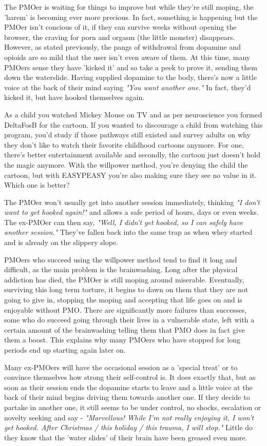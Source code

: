 \documentclass[easypeasy.tex]{subfiles}
\begin{document}
The PMOer is waiting for things to improve but while they're still moping, the 'harem' is becoming ever more precious. In fact, something is happening but the PMOer isn't concious of it, if they can survive weeks without opening the browser, the craving for porn and orgasm (the little monster) disappears. However, as stated previously, the pangs of withdrawal from dopamine and opioids are so mild that the user isn't even aware of them. At this time, many PMOers sense they have 'kicked it' and so take a peek to prove it, sending them down the waterslide. Having supplied dopamine to the body, there's now a little voice at the back of their mind saying \textit{"You want another one."} In fact, they'd kicked it, but have hooked themselves again.

As a child you watched Mickey Mouse on TV and as per neuroscience you formed DeltaFosB for the cartoon. If you wanted to discourage a child from watching this program, you'd study if those pathways still existed and survey adults on why they don't like to watch their favorite childhood cartoons anymore. For one, there's better entertainment available and secondly, the cartoon just doesn't hold the magic anymore. With the willpower method, you're denying the child the cartoon, but with EASYPEASY you're also making sure they see no value in it. Which one is better?

The PMOer won't usually get into another session immediately, thinking \textit{"I don't want to get hooked again!"} and allows a safe period of hours, days or even weeks. The ex-PMOer can then say, \textit{"Well, I didn't get hooked, so I can safely have another session."} They've fallen back into the same trap as when whey started and is already on the slippery slope.

PMOers who succeed using the willpower method tend to find it long and difficult, as the main problem is the brainwashing. Long after the physical addiction has died, the PMOer is still moping around miserable. Eventually, surviving this long term torture, it begins to dawn on them that they are not going to give in, stopping the moping and accepting that life goes on and is enjoyable without PMO. There are significantly more failures than successes, some who do succeed going through their lives in a vulnerable state, left with a certain amount of the brainwashing telling them that PMO does in fact give them a boost. This explains why many PMOers who have stopped for long periods end up starting again later on.

Many ex-PMOers will have the occasional session as a 'special treat' or to convince themselves how strong their self-control is. It does exactly that, but as soon as their session ends the dopamine starts to leave and a little voice at the back of their mind begins driving them towards another one. If they decide to partake in another one, it still seems to be under control, no shocks, escalation or novelty seeking and say - \textit{"Marvellous! While I'm not really enjoying it, I won't get hooked. After Christmas / this holiday / this trauma, I will stop."} Little do they know that the 'water slides' of their brain have been greased even more.
\end{document}
